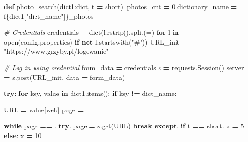 \documentclass[
]{article}
\newenvironment{Shaded}{\begin{snugshade}}{\end{snugshade}}
\newcommand{\BuiltInTok}[1]{#1}
\newcommand{\CommentTok}[1]{\textcolor[rgb]{0.56,0.35,0.01}{\textit{#1}}}
\newcommand{\ControlFlowTok}[1]{\textcolor[rgb]{0.13,0.29,0.53}{\textbf{#1}}}
\newcommand{\DecValTok}[1]{\textcolor[rgb]{0.00,0.00,0.81}{#1}}
\newcommand{\KeywordTok}[1]{\textcolor[rgb]{0.13,0.29,0.53}{\textbf{#1}}}
\newcommand{\NormalTok}[1]{#1}
\newcommand{\OperatorTok}[1]{\textcolor[rgb]{0.81,0.36,0.00}{\textbf{#1}}}
\newcommand{\SpecialCharTok}[1]{\textcolor[rgb]{0.00,0.00,0.00}{#1}}
\newcommand{\SpecialStringTok}[1]{\textcolor[rgb]{0.31,0.60,0.02}{#1}}
\newcommand{\StringTok}[1]{\textcolor[rgb]{0.31,0.60,0.02}{#1}}
\begin{document}
\begin{Shaded}
\begin{Highlighting}[]
\KeywordTok{def}\NormalTok{ photo\_search(dict1:}\BuiltInTok{dict}\NormalTok{, t }\OperatorTok{=} \StringTok{\textquotesingle{}short\textquotesingle{}}\NormalTok{):}
\NormalTok{    photos\_cnt }\OperatorTok{=} \DecValTok{0}
\NormalTok{    dictionary\_name }\OperatorTok{=} \SpecialStringTok{f\textquotesingle{}}\SpecialCharTok{\{}\NormalTok{dict1[}\StringTok{"dict\_name"}\NormalTok{]}\SpecialCharTok{\}}\SpecialStringTok{\_photos\textquotesingle{}}

    \CommentTok{\# Credentials}
\NormalTok{    credentials }\OperatorTok{=} \BuiltInTok{dict}\NormalTok{(l.rstrip().split(}\StringTok{\textquotesingle{}=\textquotesingle{}}\NormalTok{) }\ControlFlowTok{for}\NormalTok{ l }\KeywordTok{in} \BuiltInTok{open}\NormalTok{(}\StringTok{\textquotesingle{}config.properties\textquotesingle{}}\NormalTok{) }\ControlFlowTok{if} \KeywordTok{not}\NormalTok{ l.startswith(}\StringTok{"\#"}\NormalTok{))}
\NormalTok{    URL\_init }\OperatorTok{=} \StringTok{"https://www.grzyby.pl/logowanie"}

    \CommentTok{\# Log in using credential}
\NormalTok{    form\_data }\OperatorTok{=}\NormalTok{ credentials}
\NormalTok{    s }\OperatorTok{=}\NormalTok{ requests.Session()}
\NormalTok{    server }\OperatorTok{=}\NormalTok{ s.post(URL\_init, data }\OperatorTok{=}\NormalTok{ form\_data)}

    \ControlFlowTok{try}\NormalTok{:}
        \ControlFlowTok{for}\NormalTok{ key, value }\KeywordTok{in}\NormalTok{ dict1.items():}
            \ControlFlowTok{if}\NormalTok{ key }\OperatorTok{!=} \StringTok{\textquotesingle{}dict\_name\textquotesingle{}}\NormalTok{:}

\NormalTok{                URL }\OperatorTok{=}\NormalTok{ value[}\StringTok{\textquotesingle{}web\textquotesingle{}}\NormalTok{]}
\NormalTok{                page }\OperatorTok{=} \StringTok{\textquotesingle{}\textquotesingle{}}

                \ControlFlowTok{while}\NormalTok{ page }\OperatorTok{==} \StringTok{\textquotesingle{}\textquotesingle{}}\NormalTok{:}
                    \ControlFlowTok{try}\NormalTok{:}
\NormalTok{                        page }\OperatorTok{=}\NormalTok{ s.get(URL)}
                        \ControlFlowTok{break}
                    \ControlFlowTok{except}\NormalTok{:}
                        \ControlFlowTok{if}\NormalTok{ t }\OperatorTok{==} \StringTok{\textquotesingle{}short\textquotesingle{}}\NormalTok{:}
\NormalTok{                            x }\OperatorTok{=} \DecValTok{5}
                        \ControlFlowTok{else}\NormalTok{:}
\NormalTok{                            x }\OperatorTok{=} \DecValTok{10}


\end{Highlighting}
\end{Shaded}
\end{document}
